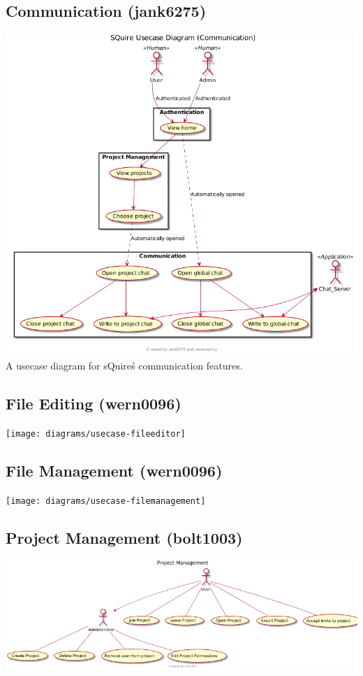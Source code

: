 \documentclass[11pt]{report}
\begin{document}
    \subsection{Communication (jank6275)}
        \includegraphics[width=\textwidth]{diagrams/usecase-communication}
        A usecase diagram for sQuire\'s communication features.
    \subsection{File Editing (wern0096)}
        \texttt{[image: diagrams/usecase-fileeditor]}
    \subsection{File Management (wern0096)}
        \texttt{[image: diagrams/usecase-filemanagement]}
    \subsection{Project Management (bolt1003)}
        \includegraphics[width=\textwidth]{diagrams/usecase-projectmanagement}
\end{document}
